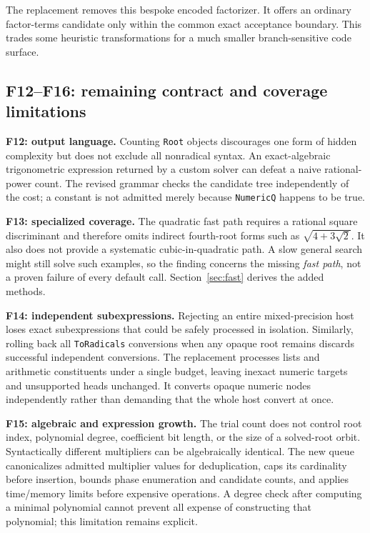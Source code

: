 \documentclass[11pt,letterpaper]{article}
\newcommand{\code}[1]{\texttt{#1}}
\theoremstyle{definition}
\begin{document}
The replacement removes this bespoke encoded factorizer. It offers an ordinary factor-terms candidate only within the common exact acceptance boundary. This trades some heuristic transformations for a much smaller branch-sensitive code surface.

\subsection{F12--F16: remaining contract and coverage limitations}

\textbf{F12: output language.} Counting \code{Root} objects discourages one form of hidden complexity but does not exclude all nonradical syntax. An exact-algebraic trigonometric expression returned by a custom solver can defeat a naive rational-power count. The revised grammar checks the candidate tree independently of the cost; a constant is not admitted merely because \code{NumericQ} happens to be true.

\textbf{F13: specialized coverage.} The quadratic fast path requires a rational square discriminant and therefore omits indirect fourth-root forms such as $\sqrt{4+3\sqrt2}$. It also does not provide a systematic cubic-in-quadratic path. A slow general search might still solve such examples, so the finding concerns the missing \emph{fast path}, not a proven failure of every default call. Section~\ref{sec:fast} derives the added methods.

\textbf{F14: independent subexpressions.} Rejecting an entire mixed-precision host loses exact subexpressions that could be safely processed in isolation. Similarly, rolling back all \code{ToRadicals} conversions when any opaque root remains discards successful independent conversions. The replacement processes lists and arithmetic constituents under a single budget, leaving inexact numeric targets and unsupported heads unchanged. It converts opaque numeric nodes independently rather than demanding that the whole host convert at once.

\textbf{F15: algebraic and expression growth.} The trial count does not control root index, polynomial degree, coefficient bit length, or the size of a solved-root orbit. Syntactically different multipliers can be algebraically identical. The new queue canonicalizes admitted multiplier values for deduplication, caps its cardinality before insertion, bounds phase enumeration and candidate counts, and applies time/memory limits before expensive operations. A degree check after computing a minimal polynomial cannot prevent all expense of constructing that polynomial; this limitation remains explicit.
\end{document}
